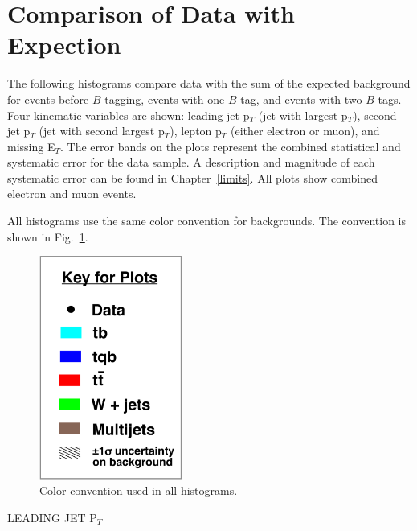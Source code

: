 \clearpage
\section{Comparison of Data with Expection}
\label{databackcompare}

The following histograms compare data with the sum of the expected background for events before $B$-tagging, events with one $B$-tag, and events with two $B$-tags. Four kinematic variables are shown: leading jet p$_{T}$ (jet with largest p$_{T}$), second jet p$_{T}$ (jet with second largest p$_{T}$), lepton p$_{T}$ (either electron or muon), and missing E$_{T}$. The error bands on the plots represent the combined statistical and systematic error for the data sample. A description and magnitude of each systematic error can be found in Chapter~\ref{limits}. All plots show combined electron and muon events.

All histograms use the same color convention for backgrounds. The convention is shown in Fig.~\ref{convention}.


\begin{figure}[!h!tbp]
\begin{center}
\includegraphics[width=0.42\textwidth]{eps/DataBackground/plot_key.eps}
\end{center}
\vspace{-0.1in}
\caption{Color convention used in all histograms.}
\label{convention}
\end{figure}

\clearpage
\begin{center}
LEADING JET P$_{T}$
\end{center}

